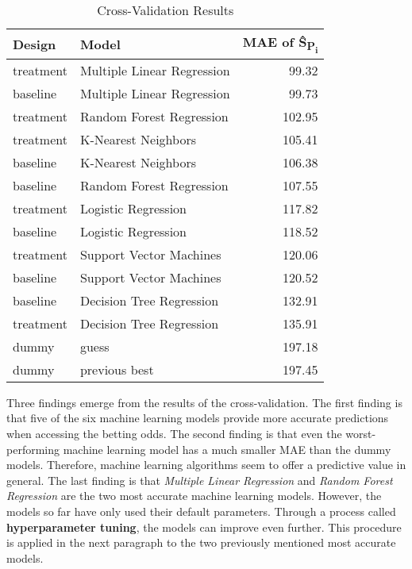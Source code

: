 \begin{table}[H]
    \renewcommand{\arraystretch}{1.0}
    \setlength{\tabcolsep}{15pt}
    \centering
    \caption{Cross-Validation Results}
    \label{tab:cv_results}
    \begin{tabularx}{\textwidth}{lXr}
    \toprule
    \textbf{Design} & \textbf{Model} & \textbf{MAE of \^{S}\textsubscript{P\textsubscript{i}}} \\ \midrule
    treatment   & Multiple Linear Regression    & 99.32 \\
    baseline    & Multiple Linear Regression    & 99.73 \\
    treatment   & Random Forest Regression      & 102.95 \\
    treatment   & K-Nearest Neighbors           & 105.41 \\
    baseline    & K-Nearest Neighbors           & 106.38 \\
    baseline    & Random Forest Regression      & 107.55 \\
    treatment   & Logistic Regression           & 117.82 \\
    baseline    & Logistic Regression           & 118.52 \\
    treatment   & Support Vector Machines       & 120.06 \\
    baseline    & Support Vector Machines       & 120.52 \\
    baseline    & Decision Tree Regression      & 132.91 \\
    treatment   & Decision Tree Regression      & 135.91 \\
    dummy       & guess                         & 197.18 \\
    dummy       & previous best                 & 197.45 \\ \bottomrule
    \end{tabularx}
\end{table}

Three findings emerge from the results of the cross-validation. The first finding is that five of the six machine learning models provide more accurate predictions when accessing the betting odds. The second finding is that even the worst-performing machine learning model has a much smaller MAE than the dummy models. Therefore, machine learning algorithms seem to offer a predictive value in general. The last finding is that \emph{Multiple Linear Regression} and \emph{Random Forest Regression} are the two most accurate machine learning models. However, the models so far have only used their default parameters. Through a process called \textbf{hyperparameter tuning}, the models can improve even further. This procedure is applied in the next paragraph to the two previously mentioned most accurate models.

